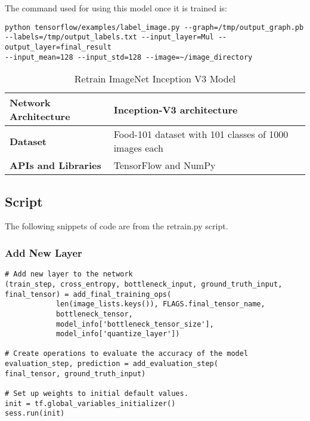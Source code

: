The command used for using this model once it is trained is:
\begin{lstlisting}[style=Command]
python tensorflow/examples/label_image.py --graph=/tmp/output_graph.pb
--labels=/tmp/output_labels.txt --input_layer=Mul --output_layer=final_result
--input_mean=128 --input_std=128 --image=~/image_directory
\end{lstlisting}

\begin{table}[h]
\centering
\caption{Retrain ImageNet Inception V3 Model}
\label{my-label}
\begin{tabular}{|l|p{9cm}|}
\hline
\textbf{Network Architecture} & Inception-V3 architecture \parencite{inception}            \\ \hline
\textbf{Dataset}              & Food-101 dataset with 101 classes of 1000 images each \parencite{food101} \\ \hline
\textbf{APIs and Libraries}   & TensorFlow and NumPy                                                        \\ \hline
\end{tabular}
\end{table}

\subsection*{Script}
The following snippets of code are from the retrain.py script.

\subsubsection*{Add New Layer}
\begin{lstlisting}[style=Python]
# Add new layer to the network
(train_step, cross_entropy, bottleneck_input, ground_truth_input,
final_tensor) = add_final_training_ops(
            len(image_lists.keys()), FLAGS.final_tensor_name,
            bottleneck_tensor,
            model_info['bottleneck_tensor_size'],
            model_info['quantize_layer'])
 
# Create operations to evaluate the accuracy of the model
evaluation_step, prediction = add_evaluation_step(
final_tensor, ground_truth_input)
 
# Set up weights to initial default values.
init = tf.global_variables_initializer()
sess.run(init)
\end{lstlisting}

